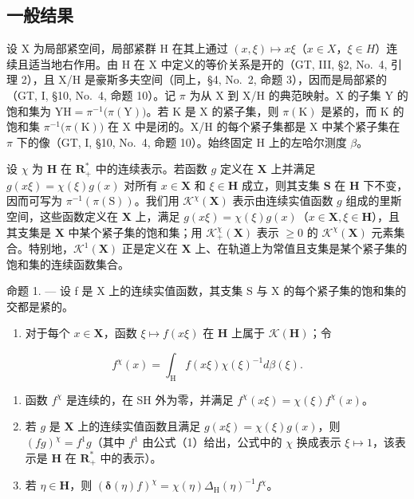 \subsection{一般结果}

设 X 为局部紧空间，局部紧群 H 在其上通过 \((x,\xi)\mapsto x\xi\)（\(x\in X\)，\(\xi\in H\)）连续且适当地右作用。由 H 在 X 中定义的等价关系是开的（GT, III, §2, No.~4, 引理 2），且 X/H 是豪斯多夫空间（同上，§4, No.~2, 命题 3），因而是局部紧的（GT, I, §10, No.~4, 命题 10）。记 \(\pi\) 为从 X 到 X/H 的典范映射。X 的子集 Y 的饱和集为 \(\mathrm{YH}=\pi^{-1}\big(\pi(\mathrm{Y})\big)\)。若 K 是 X 的紧子集，则 \(\pi(\mathrm{K})\) 是紧的，而 K 的饱和集 \(\pi^{-1}\big(\pi(\mathrm{K})\big)\) 在 X 中是闭的。X/H 的每个紧子集都是 X 中某个紧子集在 \(\pi\) 下的像（GT, I, §10, No.~4, 命题 10）。始终固定 H 上的左哈尔测度 \(\beta\)。

设 \(\chi\) 为 \(\mathbf{H}\) 在 \(\mathbf{R}_+^*\) 中的连续表示。若函数 \(g\) 定义在 \(\mathbf{X}\) 上并满足 \(g(x\xi) = \chi (\xi)g(x)\) 对所有 \(x\in \mathbf{X}\) 和 \(\xi \in \mathbf{H}\) 成立，则其支集 \(\mathbf{S}\) 在 \(\mathbf{H}\) 下不变，因而可写为 \(\pi^{-1} (\pi (\mathrm{S}))\)。我们用 \(\mathcal{K}^{\chi}(\mathbf{X})\) 表示由连续实值函数 \(g\) 组成的里斯空间，这些函数定义在 \(\mathbf{X}\) 上，满足 \(g(x\xi) = \chi (\xi)g(x)\)（\(x\in \mathbf{X},\xi \in \mathbf{H}\)），且其支集是 \(\mathbf{X}\) 中某个紧子集的饱和集；用 \(\mathcal{K}_+^\chi (\mathbf{X})\) 表示 \(\geqslant 0\) 的 \(\mathcal{K}^{\chi}(\mathbf{X})\) 元素集合。特别地，\(\mathcal{K}^1 (\mathbf{X})\) 正是定义在 \(\mathbf{X}\) 上、在轨道上为常值且支集是某个紧子集的饱和集的连续函数集合。

命题 1. --- 设 f 是 X 上的连续实值函数，其支集 S 与 X 的每个紧子集的饱和集的交都是紧的。

\begin{enumerate}
\def\labelenumi{\alph{enumi})}
\tightlist
\item
  对于每个 \(x \in \mathbf{X}\)，函数 \(\xi \mapsto f(x\xi)\) 在 \(\mathbf{H}\) 上属于 \(\mathcal{K}(\mathbf{H})\)；令
\end{enumerate}

\[
f ^ {\chi} (x) = \int_ {\mathrm{H}} f (x \xi) \chi (\xi) ^ {- 1} d \beta (\xi).\tag{1}
\]

\begin{enumerate}
\def\labelenumi{\alph{enumi})}
\setcounter{enumi}{1}
\item
  函数 \(f^{\chi}\) 是连续的，在 SH 外为零，并满足 \(f^{\chi}(x\xi) = \chi(\xi)f^{\chi}(x)\)。
\item
  若 \(g\) 是 \(\mathbf{X}\) 上的连续实值函数且满足 \(g(x\xi) = \chi(\xi)g(x)\)，则 \((fg)^{\chi} = f^{1}g\)（其中 \(f^{1}\) 由公式（1）给出，公式中的 \(\chi\) 换成表示 \(\xi \mapsto 1\)，该表示是 \(\mathbf{H}\) 在 \(\mathbf{R}_{+}^{*}\) 中的表示）。
\item
  若 \(\eta \in \mathbf{H}\)，则 \(\left(\pmb{\delta}(\eta)f\right)^{\chi} = \chi (\eta)\Delta_{\mathrm{H}}(\eta)^{-1}f^{\chi}\)。
\end{enumerate}

